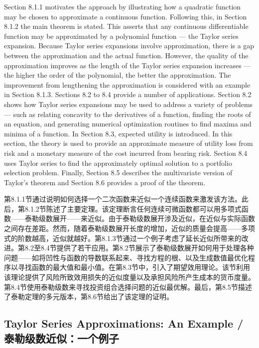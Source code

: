 \begin{original}
Section 8.1.1 motivates the approach by illustrating how a quadratic function may be chosen to approximate a continuous function. Following this, in Section 8.1.2 the main theorem is stated. This asserts that any continuous differentiable function may be approximated by a polynomial function --- the Taylor series expansion. Because Taylor series expansions involve approximation, there is a gap between the approximation and the actual function. However, the quality of the approximation improves as the length of the Taylor series expansion increases --- the higher the order of the polynomial, the better the approximation. The improvement from lengthening the approximation is considered with an example in Section 8.1.3. Sections 8.2 to 8.4 provide a number of applications. Section 8.2 shows how Taylor series expansions may be used to address a variety of problems --- such as relating concavity to the derivatives of a function, finding the roots of an equation, and generating numerical optimization routines to find maxima and minima of a function. In Section 8.3, expected utility is introduced. In this section, the theory is used to provide an approximate measure of utility loss from risk and a monetary measure of the cost incurred from bearing risk. Section 8.4 uses Taylor series to find the approximately optimal solution to a portfolio selection problem. Finally, Section 8.5 describes the multivariate version of Taylor's theorem and Section 8.6 provides a proof of the theorem.
\end{original}
\begin{translation}
第8.1.1节通过说明如何选择一个二次函数来近似一个连续函数来激发该方法。此后，第8.1.2节陈述了主要定理。该定理断言任何连续可微函数都可以用多项式函数——泰勒级数展开——来近似。由于泰勒级数展开涉及近似，在近似与实际函数之间存在差距。然而，随着泰勒级数展开长度的增加，近似的质量会提高——多项式的阶数越高，近似就越好。第8.1.3节通过一个例子考虑了延长近似所带来的改进。第8.2至8.4节提供了若干应用。第8.2节展示了泰勒级数展开如何用于处理各种问题——如将凹性与函数的导数联系起来、寻找方程的根、以及生成数值最优化程序以寻找函数的最大值和最小值。在第8.3节中，引入了期望效用理论。该节利用该理论提供了风险所致效用损失的近似度量以及承担风险所产生成本的货币度量。第8.4节使用泰勒级数来寻找投资组合选择问题的近似最优解。最后，第8.5节描述了泰勒定理的多元版本，第8.6节给出了该定理的证明。
\end{translation}

\subsection{Taylor Series Approximations: An Example / 泰勒级数近似：一个例子}

